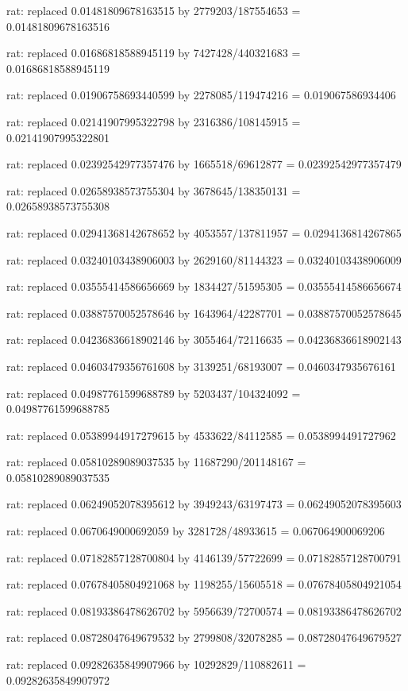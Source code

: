 \documentclass[a4paper,10pt]{article}
\begin{document}
\begin{eulernotebook}
\begin{eulercomment}
\begin{eulercomment}
\begin{eulercomment}
\begin{eulercomment}
\begin{eulercomment}
\begin{eulercomment}
\begin{eulercomment}
\begin{eulercomment}
\begin{eulercomment}
\begin{eulercomment}
\begin{eulercomment}
\begin{eulercomment}
\begin{eulercomment}
\begin{eulercomment}
\begin{eulercomment}
\begin{eulercomment}
\begin{euleroutput}
  rat: replaced 0.01481809678163515 by 2779203/187554653 = 0.01481809678163516
  
  rat: replaced 0.01686818588945119 by 7427428/440321683 = 0.01686818588945119
  
  rat: replaced 0.01906758693440599 by 2278085/119474216 = 0.019067586934406
  
  rat: replaced 0.02141907995322798 by 2316386/108145915 = 0.02141907995322801
  
  rat: replaced 0.02392542977357476 by 1665518/69612877 = 0.02392542977357479
  
  rat: replaced 0.02658938573755304 by 3678645/138350131 = 0.02658938573755308
  
  rat: replaced 0.02941368142678652 by 4053557/137811957 = 0.0294136814267865
  
  rat: replaced 0.03240103438906003 by 2629160/81144323 = 0.03240103438906009
  
  rat: replaced 0.03555414586656669 by 1834427/51595305 = 0.03555414586656674
  
  rat: replaced 0.03887570052578646 by 1643964/42287701 = 0.03887570052578645
  
  rat: replaced 0.04236836618902146 by 3055464/72116635 = 0.04236836618902143
  
  rat: replaced 0.04603479356761608 by 3139251/68193007 = 0.0460347935676161
  
  rat: replaced 0.04987761599688789 by 5203437/104324092 = 0.04987761599688785
  
  rat: replaced 0.05389944917279615 by 4533622/84112585 = 0.0538994491727962
  
  rat: replaced 0.05810289089037535 by 11687290/201148167 = 0.05810289089037535
  
  rat: replaced 0.06249052078395612 by 3949243/63197473 = 0.06249052078395603
  
  rat: replaced 0.0670649000692059 by 3281728/48933615 = 0.067064900069206
  
  rat: replaced 0.07182857128700804 by 4146139/57722699 = 0.07182857128700791
  
  rat: replaced 0.07678405804921068 by 1198255/15605518 = 0.07678405804921054
  
  rat: replaced 0.08193386478626702 by 5956639/72700574 = 0.08193386478626702
  
  rat: replaced 0.08728047649679532 by 2799808/32078285 = 0.08728047649679527
  
  rat: replaced 0.09282635849907966 by 10292829/110882611 = 0.09282635849907972
  

\end{euleroutput}
\end{eulercomment}
\end{eulercomment}
\end{eulercomment}
\end{eulercomment}
\end{eulercomment}
\end{eulercomment}
\end{eulercomment}
\end{eulercomment}
\end{eulercomment}
\end{eulercomment}
\end{eulercomment}
\end{eulercomment}
\end{eulercomment}
\end{eulercomment}
\end{eulercomment}
\end{eulercomment}
\end{eulernotebook}
\end{document}
